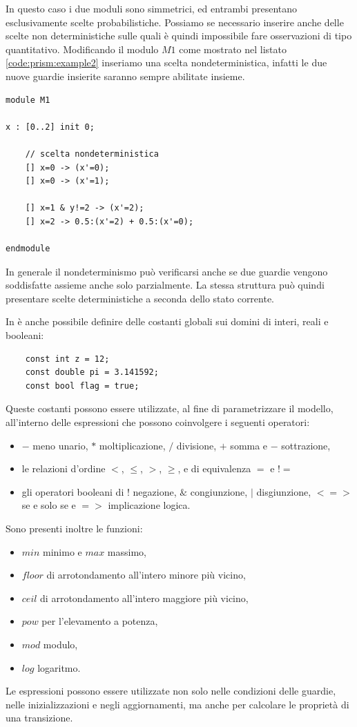 In questo caso i due moduli sono simmetrici, ed entrambi presentano esclusivamente scelte probabilistiche. Possiamo se necessario inserire anche delle scelte non deterministiche sulle quali è quindi impossibile fare osservazioni di tipo quantitativo. Modificando il modulo $M1$ come mostrato nel listato \ref{code:prism:example2} inseriamo una scelta nondeterministica, infatti le due nuove guardie insierite saranno sempre abilitate insieme.
\begin{lstlisting}[language=prism,style=eclipse,caption={Scelta nondeterministica in \prism{}},label=code:prism:example2]
module M1

x : [0..2] init 0;

	// scelta nondeterministica
    [] x=0 -> (x'=0);
	[] x=0 -> (x'=1);
	
    [] x=1 & y!=2 -> (x'=2);
    [] x=2 -> 0.5:(x'=2) + 0.5:(x'=0);
	
endmodule
\end{lstlisting}
In generale il nondeterminismo può verificarsi anche se due guardie vengono soddisfatte assieme anche solo parzialmente. La stessa struttura può quindi presentare scelte deterministiche a seconda dello stato corrente.

In \prism{} è anche possibile definire delle costanti globali sui domini di interi, reali e booleani:
\begin{verbatim}
	const int z = 12;
	const double pi = 3.141592;
	const bool flag = true;
\end{verbatim}
Queste costanti possono essere utilizzate, al fine di parametrizzare il modello, all'interno delle espressioni che possono coinvolgere i seguenti operatori:
\begin{itemize}
	\item $-$ meno unario, $*$ moltiplicazione, $\slash$ divisione, $+$ somma e $-$ sottrazione,
	\item le relazioni d'ordine $<$, $\leq$, $>$, $\geq$, e di equivalenza $=$ e $!=$
	\item gli operatori booleani di $!$ negazione, $\&$ congiunzione, $|$ disgiunzione, $<=>$ se e solo se e $=>$ implicazione logica.
\end{itemize}
Sono presenti inoltre le funzioni:
\begin{itemize}
	\item $min$ minimo e $max$ massimo,
	\item $floor$ di arrotondamento all'intero minore più vicino,
	\item $ceil$ di arrotondamento all'intero maggiore più vicino,
	\item $pow$ per l'elevamento a potenza,
	\item $mod$ modulo,
	\item $log$ logaritmo.
\end{itemize}
Le espressioni possono essere utilizzate non solo nelle condizioni delle guardie, nelle inizializzazioni e negli aggiornamenti, ma anche per calcolare le proprietà di una transizione.


